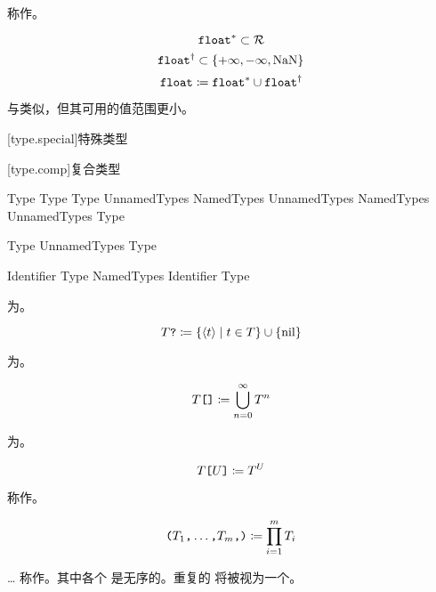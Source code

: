 \pnum
{}称作。

$$ \texttt{float}^\ast \subset \mathcal{R} $$
$$ \texttt{float}^\dagger \subset \{ +\infty, -\infty, \mathrm{NaN} \} $$
$$ \texttt{float} \coloneqq \texttt{float}^\ast \cup \texttt{float}^\dagger $$

与类似，但其可用的值范围更小。

[type.special]{特殊类型}

\begin{bnf}
 \br
     \br
\end{bnf}

[type.comp]{复合类型}

\begin{bnf}
 \br
    Type  \br
    Type \terminal{[} Type \terminal{]}
    \terminal{(} UnnamedTypes \terminal{)} \br
    \terminal{(} NamedTypes \terminal{)} \br
    \terminal{(} UnnamedTypes \terminal{,} NamedTypes \terminal{)} \br
    \terminal{\{} UnnamedTypes \terminal{\}}
    Type \terminal{*}
\end{bnf}

\begin{bnf}
 \br
    Type \br
    UnnamedTypes \terminal{,} Type
\end{bnf}

\begin{bnf}
 \br
    Identifier \terminal{:} Type \br
    NamedTypes \terminal{,} Identifier \terminal{:} Type
\end{bnf}

\pnum
{}为。

$$ T\texttt{?} \coloneqq \{ \langle t \rangle \mid t \in T \} \cup \{ \mathrm{nil} \} $$

\pnum
{}为。

$$ T\texttt{[]} \coloneqq \bigcup^\infty_{n=0} T^n $$

\pnum
{}为。

$$ T\texttt{[}U\texttt{]} \coloneqq T^U $$

\pnum
{} 称作。

$$ \texttt{(}T_1\texttt{,} \ldots\texttt{,} T_m\texttt{,}\texttt{)} \coloneqq \prod^m_{i=1} T_i$$

\pnum
{}\ldots{} 称作。其中各个  是无序的。重复的  将被视为一个。

